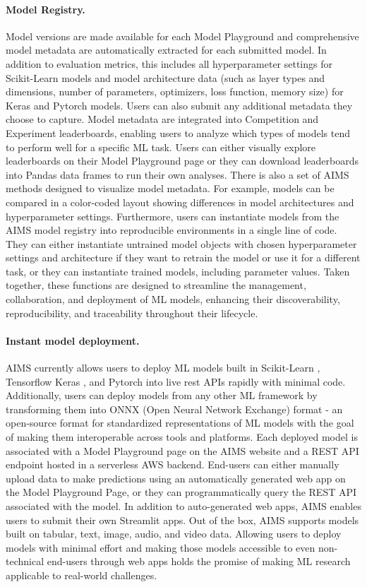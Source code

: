 \paragraph{Model Registry.} Model versions are made available for each Model Playground and comprehensive model metadata are automatically extracted for each submitted model. In addition to evaluation metrics, this includes all hyperparameter settings for Scikit-Learn models and model architecture data (such as layer types and dimensions, number of parameters, optimizers, loss function, memory size) for Keras and Pytorch models. Users can also submit any additional metadata they choose to capture. Model metadata are integrated into Competition and Experiment leaderboards, enabling users to analyze which types of models tend to perform well for a specific ML task. Users can either visually explore leaderboards on their Model Playground page or they can download leaderboards into Pandas data frames to run their own analyses. There is also a set of AIMS methods designed to visualize model metadata. For example, models can be compared in a color-coded layout showing differences in model architectures and hyperparameter settings. Furthermore, users can instantiate models from the AIMS model registry into reproducible environments in a single line of code. They can either instantiate untrained model objects with chosen hyperparameter settings and architecture if they want to retrain the model or use it for a different task, or they can instantiate trained models, including parameter values. Taken together, these functions are designed to streamline the management, collaboration, and deployment of ML models, enhancing their discoverability, reproducibility, and traceability throughout their lifecycle.

\paragraph{Instant model deployment.} AIMS currently allows users to deploy ML models built in Scikit-Learn \citep{pedregosa_scikit-learn:_2011}, Tensorflow Keras \citep{abadi_tensorflow_2016, chollet_keras_2015}, and Pytorch \citep{paszke_pytorch_2019} into live rest APIs rapidly with minimal code. Additionally, users can deploy models from any other ML framework by transforming them into ONNX (Open Neural Network Exchange) format - an open-source format for standardized representations of ML models with the goal of making them interoperable across tools and platforms. Each deployed model is associated with a Model Playground page on the AIMS website and a REST API endpoint hosted in a serverless AWS backend. End-users can either manually upload data to make predictions using an automatically generated web app on the Model Playground Page, or they can programmatically query the REST API associated with the model. In addition to auto-generated web apps, AIMS enables users to submit their own Streamlit apps. Out of the box, AIMS supports models built on tabular, text, image, audio, and video data. Allowing users to deploy models with minimal effort and making those models accessible to even non-technical end-users through web apps holds the promise of making ML research applicable to real-world challenges.



